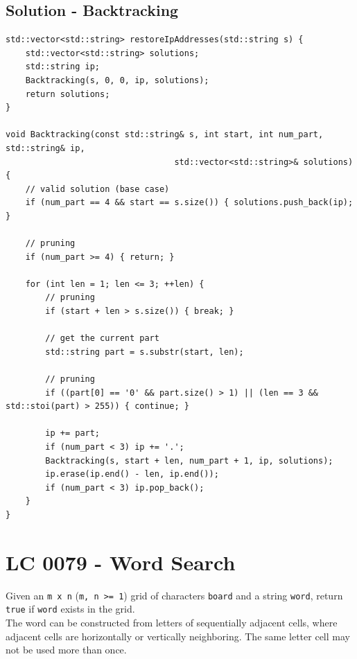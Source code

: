 \subsection*{Solution - Backtracking}
\begin{lstlisting}
std::vector<std::string> restoreIpAddresses(std::string s) {
	std::vector<std::string> solutions;
	std::string ip;
	Backtracking(s, 0, 0, ip, solutions);
	return solutions;
}

void Backtracking(const std::string& s, int start, int num_part, std::string& ip,
								  std::vector<std::string>& solutions) {
	// valid solution (base case)
	if (num_part == 4 && start == s.size()) { solutions.push_back(ip); }
	
	// pruning
	if (num_part >= 4) { return; }
	
	for (int len = 1; len <= 3; ++len) {
		// pruning
		if (start + len > s.size()) { break; }
		
		// get the current part
		std::string part = s.substr(start, len);
		
		// pruning
		if ((part[0] == '0' && part.size() > 1) || (len == 3 && std::stoi(part) > 255)) { continue; }
		
		ip += part;
		if (num_part < 3) ip += '.';
		Backtracking(s, start + len, num_part + 1, ip, solutions);
		ip.erase(ip.end() - len, ip.end());
		if (num_part < 3) ip.pop_back();
	}
}

\end{lstlisting}

\section{LC 0079 - Word Search}
Given an {\colorbox{CodeBackground}{\lstinline|m x n|}} ({\colorbox{CodeBackground}{\lstinline|m, n >= 1|}}) grid of characters {\colorbox{CodeBackground}{\lstinline|board|}} and a string {\colorbox{CodeBackground}{\lstinline|word|}}, return {\colorbox{CodeBackground}{\lstinline|true|}} if {\colorbox{CodeBackground}{\lstinline|word|}} exists in the grid.\\

The word can be constructed from letters of sequentially adjacent cells, where adjacent cells are horizontally or vertically neighboring. The same letter cell may not be used more than once.\\

